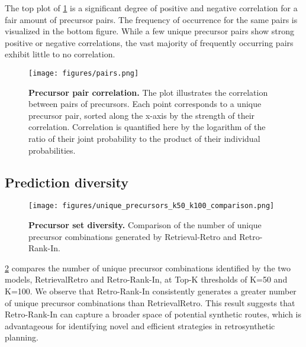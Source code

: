 The top plot of \cref{fig:prec_pairs_correlation} is a significant degree of positive and negative correlation for a fair amount of precursor pairs. The frequency of occurrence for the same pairs is visualized in the bottom figure. While a few unique precursor pairs show strong positive or negative correlations, the vast majority of frequently occurring pairs exhibit little to no correlation.

\begin{figure}[htb!]
    \centering
        \centering
        \texttt{[image: figures/pairs.png]}
        \caption{\textbf{Precursor pair correlation.} 
        The plot illustrates the correlation between pairs of precursors. Each point corresponds to a unique precursor pair, sorted along the x-axis by the strength of their correlation. Correlation is quantified here by the logarithm of the ratio of their joint probability to the product of their individual probabilities.}
 \label{fig:prec_pairs_correlation}
\end{figure}

\subsection{Prediction diversity}

\begin{figure}%
    \centering
        \centering
        \texttt{[image: figures/unique\_precursors\_k50\_k100\_comparison.png]}
        \caption{\textbf{Precursor set diversity.} Comparison of the number of unique precursor combinations generated by Retrieval-Retro and Retro-Rank-In.}
        \label{fig:plot10}
\end{figure}


\cref{fig:plot10} compares the number of unique precursor combinations identified by the two models, RetrievalRetro and Retro-Rank-In, at Top-K thresholds of K=50 and K=100. We observe that Retro-Rank-In consistently generates a greater number of unique precursor combinations than RetrievalRetro. This result suggests that Retro-Rank-In can capture a broader space of potential synthetic routes, which is advantageous for identifying novel and efficient strategies in retrosynthetic planning.

